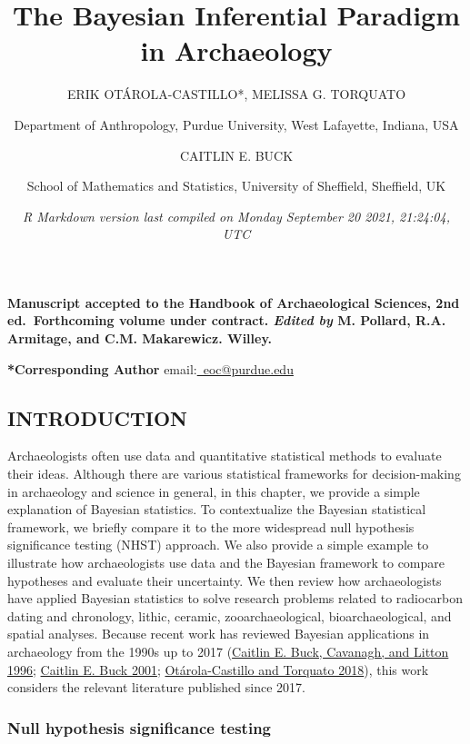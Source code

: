 \documentclass[
]{article}
\title{\textbf{The Bayesian Inferential Paradigm in Archaeology}}
\author{ERIK OTÁROLA-CASTILLO*, MELISSA G. TORQUATO \and Department of
Anthropology, Purdue University, West Lafayette, Indiana,
USA \and CAITLIN E. BUCK \and School of Mathematics and Statistics,
University of Sheffield, Sheffield, UK}
\date{\emph{R Markdown version last compiled on Monday September 20
2021, 21:24:04, UTC}}
\begin{document}
\maketitle

\vspace{4cm}

\noindent \textbf{Manuscript accepted to the Handbook of Archaeological
Sciences, 2nd ed.~Forthcoming volume under contract. \emph{Edited by} M.
Pollard, R.A. Armitage, and C.M. Makarewicz. Willey.}

\vspace{2.5cm}

\textbf{*\*Corresponding Author} \noindent
email:\href{mailto:eoc@purdue.edu}{\color{blue} \,eoc@purdue.edu}\newline

\newpage

\hypertarget{introduction}{%
\subsection{INTRODUCTION}\label{introduction}}

Archaeologists often use data and quantitative statistical methods to
evaluate their ideas. Although there are various statistical frameworks
for decision-making in archaeology and science in general, in this
chapter, we provide a simple explanation of Bayesian statistics. To
contextualize the Bayesian statistical framework, we briefly compare it
to the more widespread null hypothesis significance testing (NHST)
approach. We also provide a simple example to illustrate how
archaeologists use data and the Bayesian framework to compare hypotheses
and evaluate their uncertainty. We then review how archaeologists have
applied Bayesian statistics to solve research problems related to
radiocarbon dating and chronology, lithic, ceramic, zooarchaeological,
bioarchaeological, and spatial analyses. Because recent work has
reviewed Bayesian applications in archaeology from the 1990s up to 2017
(\protect\hyperlink{ref-buck_bayesian_1996}{Caitlin E. Buck, Cavanagh,
and Litton 1996}; \protect\hyperlink{ref-buck_applications_2001}{Caitlin
E. Buck 2001};
\protect\hyperlink{ref-otarola-castillo_bayesian_2018}{Otárola-Castillo
and Torquato 2018}), this work considers the relevant literature
published since 2017.

\hypertarget{null-hypothesis-significance-testing}{%
\subsubsection{Null hypothesis significance
testing}\label{null-hypothesis-significance-testing}}
\end{document}
